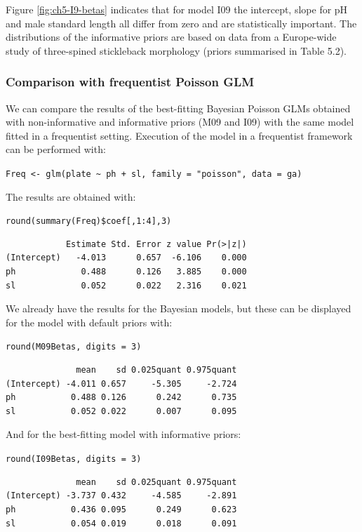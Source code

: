 \documentclass[
]{book}
\begin{document}
Figure \ref{fig:ch5-I9-betas} indicates that for model I09 the intercept, slope for pH and male standard length all differ from zero and are statistically important. The distributions of the informative priors are based on data from a Europe-wide study of three-spined stickleback morphology (priors summarised in Table 5.2).

\hypertarget{pois-freq-comp}{%
\subsubsection{Comparison with frequentist Poisson GLM}\label{pois-freq-comp}}

We can compare the results of the best-fitting Bayesian Poisson GLMs obtained with non-informative and informative priors (M09 and I09) with the same model fitted in a frequentist setting. Execution of the model in a frequentist framework can be performed with:

\texttt{Freq\ \textless{}-\ glm(plate\ \textasciitilde{}\ ph\ +\ sl,\ family\ =\ "poisson",\ data\ =\ ga)}

The results are obtained with:

\texttt{round(summary(Freq)\$coef{[},1:4{]},3)}

\begin{verbatim}
            Estimate Std. Error z value Pr(>|z|)
(Intercept)   -4.013      0.657  -6.106    0.000
ph             0.488      0.126   3.885    0.000
sl             0.052      0.022   2.316    0.021
\end{verbatim}

We already have the results for the Bayesian models, but these can be displayed for the model with default priors with:

\texttt{round(M09Betas,\ digits\ =\ 3)}

\begin{verbatim}
              mean    sd 0.025quant 0.975quant
(Intercept) -4.011 0.657     -5.305     -2.724
ph           0.488 0.126      0.242      0.735
sl           0.052 0.022      0.007      0.095
\end{verbatim}

And for the best-fitting model with informative priors:

\texttt{round(I09Betas,\ digits\ =\ 3)}

\begin{verbatim}
              mean    sd 0.025quant 0.975quant
(Intercept) -3.737 0.432     -4.585     -2.891
ph           0.436 0.095      0.249      0.623
sl           0.054 0.019      0.018      0.091
\end{verbatim}
\end{document}
